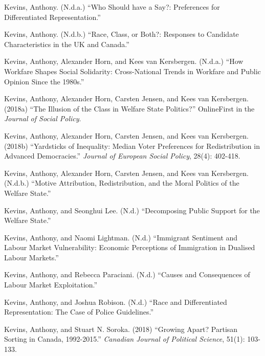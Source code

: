 \documentclass[letterpaper]{scrartcl}
\begin{document}
\begin{hangparas}{.25in}{1}
    Kevins, Anthony. (N.d.a.) ``Who Should have a Say?: Preferences for Differentiated Representation.''
    \vspace{-.5em}

    Kevins, Anthony. (N.d.b.) ``Race, Class, or Both?: Responses to Candidate Characteristics in the UK and Canada.''
    \vspace{-.5em}

    Kevins, Anthony, Alexander Horn, and Kees van Kersbergen. (N.d.a.) ``How Workfare Shapes Social Solidarity: Cross-National Trends in Workfare and Public Opinion Since the 1980s.''
    \vspace{-.5em}

    Kevins, Anthony, Alexander Horn, Carsten Jensen, and Kees van Kersbergen. (2018a) ``The Illusion of the Class in Welfare State Politics?'' OnlineFirst in the \textit{Journal of Social Policy}.
    \vspace{-.5em}

    Kevins, Anthony, Alexander Horn, Carsten Jensen, and Kees van Kersbergen. (2018b) ``Yardsticks of Inequality: Median Voter Preferences for Redistribution in Advanced Democracies.'' \textit{Journal of European Social Policy}, 28(4): 402-418.
    \vspace{-.5em}

    Kevins, Anthony, Alexander Horn, Carsten Jensen, and Kees van Kersbergen. (N.d.b.) ``Motive Attribution, Redistribution, and the Moral Politics of the Welfare State.''
    \vspace{-.5em}

    Kevins, Anthony, and Seonghui Lee. (N.d.) ``Decomposing Public Support for the Welfare State.''
    \vspace{-.5em}

    Kevins, Anthony, and Naomi Lightman. (N.d.) ``Immigrant Sentiment and Labour Market Vulnerability: Economic Perceptions of Immigration in Dualised Labour Markets.''
    \vspace{-.5em}

    Kevins, Anthony, and Rebecca Paraciani. (N.d.) ``Causes and Consequences of Labour Market Exploitation.''
    \vspace{-.5em}

    Kevins, Anthony, and Joshua Robison. (N.d.) ``Race and Differentiated Representation: The Case of Police Guidelines.'' \vspace{-.5em}

    Kevins, Anthony, and Stuart N. Soroka. (2018) ``Growing Apart? Partisan Sorting in Canada, 1992-2015.'' \textit{Canadian Journal of Political Science}, 51(1): 103-133.
    \vspace{-.5em}


\end{hangparas}
\end{document}
